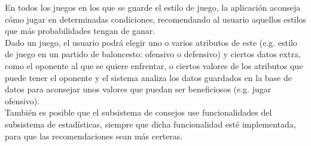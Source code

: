 En todos los juegos en los que se guarde el estilo de juego, la aplicación
aconseja cómo jugar en determinadas condiciones, recomendando al usuario aquellos
estilos que más probabilidades tengan de ganar.\\

Dado un juego, el usuario podrá elegir uno o varios atributos de este (e.g. estilo
de juego en un partido de baloncesto: ofensivo o defensivo) y ciertos datos extra,
como el oponente al que se quiere enfrentar, o ciertos valores de los atributos 
que puede tener el oponente y el sistema analiza los datos guardados en la base
de datos para aconsejar unos valores que puedan ser beneficiosos (e.g. jugar ofensivo).\\

También es posible que el subsistema de consejos use funcionalidades del subsistema
de estadísticas, siempre que dicha funcionalidad esté implementada, para que las
recomendaciones sean más certeras.\\

